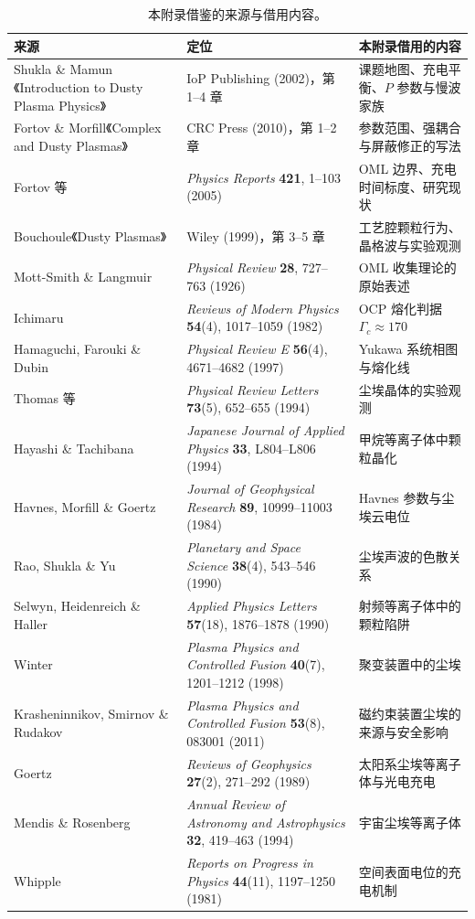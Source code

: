 \begin{table}[htbp]
  \centering
  \caption{本附录借鉴的来源与借用内容。}
  \label{tab:app-r-source}
  \begin{tabular}{@{}p{4.6cm}p{5.6cm}p{5.6cm}@{}}
    \toprule
    来源 & 定位 & 本附录借用的内容 \\
    \midrule
    Shukla \& Mamun《Introduction to Dusty Plasma Physics》 & IoP Publishing (2002)，第 1--4 章 & 课题地图、充电平衡、$P$ 参数与慢波家族 \\
    Fortov \& Morfill《Complex and Dusty Plasmas》 & CRC Press (2010)，第 1--2 章 & 参数范围、强耦合与屏蔽修正的写法 \\
    Fortov 等 & \emph{Physics Reports} \textbf{421}, 1--103 (2005) & OML 边界、充电时间标度、研究现状 \\
    Bouchoule《Dusty Plasmas》 & Wiley (1999)，第 3--5 章 & 工艺腔颗粒行为、晶格波与实验观测 \\
    Mott-Smith \& Langmuir & \emph{Physical Review} \textbf{28}, 727--763 (1926) & OML 收集理论的原始表述 \\
    Ichimaru & \emph{Reviews of Modern Physics} \textbf{54}(4), 1017--1059 (1982) & OCP 熔化判据 $\Gamma_c\approx170$ \\
    Hamaguchi, Farouki \& Dubin & \emph{Physical Review E} \textbf{56}(4), 4671--4682 (1997) & Yukawa 系统相图与熔化线 \\
    Thomas 等 & \emph{Physical Review Letters} \textbf{73}(5), 652--655 (1994) & 尘埃晶体的实验观测 \\
    Hayashi \& Tachibana & \emph{Japanese Journal of Applied Physics} \textbf{33}, L804--L806 (1994) & 甲烷等离子体中颗粒晶化 \\
    Havnes, Morfill \& Goertz & \emph{Journal of Geophysical Research} \textbf{89}, 10999--11003 (1984) & Havnes 参数与尘埃云电位 \\
    Rao, Shukla \& Yu & \emph{Planetary and Space Science} \textbf{38}(4), 543--546 (1990) & 尘埃声波的色散关系 \\
    Selwyn, Heidenreich \& Haller & \emph{Applied Physics Letters} \textbf{57}(18), 1876--1878 (1990) & 射频等离子体中的颗粒陷阱 \\
    Winter & \emph{Plasma Physics and Controlled Fusion} \textbf{40}(7), 1201--1212 (1998) & 聚变装置中的尘埃 \\
    Krasheninnikov, Smirnov \& Rudakov & \emph{Plasma Physics and Controlled Fusion} \textbf{53}(8), 083001 (2011) & 磁约束装置尘埃的来源与安全影响 \\
    Goertz & \emph{Reviews of Geophysics} \textbf{27}(2), 271--292 (1989) & 太阳系尘埃等离子体与光电充电 \\
    Mendis \& Rosenberg & \emph{Annual Review of Astronomy and Astrophysics} \textbf{32}, 419--463 (1994) & 宇宙尘埃等离子体 \\
    Whipple & \emph{Reports on Progress in Physics} \textbf{44}(11), 1197--1250 (1981) & 空间表面电位的充电机制 \\
    \bottomrule
  \end{tabular}
\end{table}

